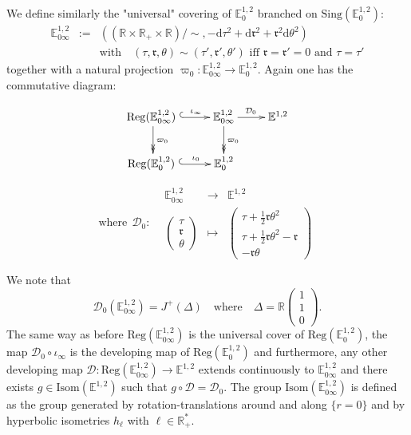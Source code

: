 \documentclass[a4paper,12pt]{article}
\def\r{\mathfrak{r}}
\def\D{\mathcal{D}}
\def\isom{Isom}
\def\d{\mathrm{d}}
\def\D{\mathcal{D}}
\def\sing{\mathrm{Sing}}
\def\RR{\mathbb{R}}
\newcommand{\mass}[1]{{\mathbb E}^{1,2}_{#1}}
\def\isom{\mathrm{Isom}}
\def\Reg{\mathrm{Reg}}
\def\reg{\Reg}
\newcommand{\fonction}[5]{\displaystyle#1:\begin{array}{l|rcl}
& \displaystyle #2 & \longrightarrow & \displaystyle #3 \\
    & \displaystyle #4 & \longmapsto & \displaystyle #5 \end{array}}
\begin{document}
We define similarly the "universal" covering of $\mass{0}$ branched on $\sing(\mass{0})$:
\begin{eqnarray*}
\mass{0\infty}&:=& \left((\RR\times \RR_+\times \RR)/\sim, -\d \tau^2+\d \r^2+\r^2\d\theta^2\right)  \\&& \text{with} \quad  (\tau,\r,\theta)\sim (\tau',\r',\theta') \text{ iff }  \r=\r'=0 \text{ and } \tau=\tau'
\end{eqnarray*}
together with a natural projection $\varpi_0: \mass{0\infty} \rightarrow \mass{0}$.  
Again one has the commutative diagram: \\
\begin{minipage}[t]{0.405\textwidth}
$$\xymatrix{
\reg(\mass{0\infty})~\ar@{^{(}->}[r]^{~~~~\iota_\infty}\ar@{->>}[d]^{\varpi_0}&\mass{0\infty} \ar[r]^{\D_0}\ar@{->>}[d]^{\varpi_0}& \mass{} \\ 
\reg(\mass{0})~\ar@{^{(}->}[r]^{~~~~\iota_0} & \mass{0} 
} 
$$
\end{minipage}
\begin{minipage}[t]{0.59\textwidth}
$$
\text{where} ~~
 \fonction{\D_0}{\mass{0\infty} }{\mass{}}
{\begin{pmatrix}\tau \\ \r \\ \theta \end{pmatrix}}{
\begin{pmatrix} \tau+\frac{1}{2}\r\theta^2   \\ \tau +\frac{1}{2}\r\theta^2-\r \\ -\r\theta \end{pmatrix}
}
$$
\end{minipage}
We note that 
$$\D_0\left(\mass{0\infty}\right) = J^+(\Delta) \quad  \text{where} \quad \Delta = \RR\begin{pmatrix}1 \\ 1 \\ 0 \end{pmatrix}.$$
The same way as before
$\reg(\mass{0\infty})$ is the universal cover of $\reg(\mass{0})$, the map $\D_0\circ \iota_\infty$ is the developing map of $\reg(\mass{0})$ and furthermore, any other developing map $\D:\Reg(\mass{0\infty})\rightarrow \mass{}$ extends continuously to $\mass{0\infty}$ and there exists $g\in \isom(\mass{})$ such that $g\circ \D = \D_0$. The group $\isom(\mass{0\infty})$ is defined as the group generated by rotation-translations  around and  along $\{r=0\}$ and by hyperbolic isometries $h_\ell$  with $\ell \in \RR_+^*$.
\end{document}

